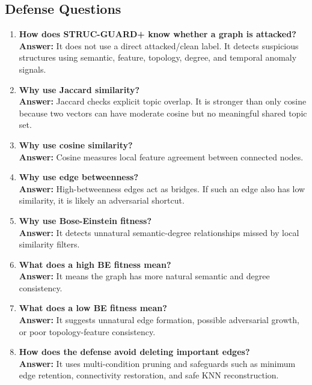 \documentclass[12pt,a4paper]{article}
\begin{document}
\subsection{Defense Questions}
\begin{enumerate}[label=\textbf{Q\arabic*.},resume]
    \item \textbf{How does STRUC-GUARD+ know whether a graph is attacked?}\\
    \textbf{Answer:} It does not use a direct attacked/clean label. It detects suspicious structures using semantic, feature, topology, degree, and temporal anomaly signals.

    \item \textbf{Why use Jaccard similarity?}\\
    \textbf{Answer:} Jaccard checks explicit topic overlap. It is stronger than only cosine because two vectors can have moderate cosine but no meaningful shared topic set.

    \item \textbf{Why use cosine similarity?}\\
    \textbf{Answer:} Cosine measures local feature agreement between connected nodes.

    \item \textbf{Why use edge betweenness?}\\
    \textbf{Answer:} High-betweenness edges act as bridges. If such an edge also has low similarity, it is likely an adversarial shortcut.

    \item \textbf{Why use Bose-Einstein fitness?}\\
    \textbf{Answer:} It detects unnatural semantic-degree relationships missed by local similarity filters.

    \item \textbf{What does a high BE fitness mean?}\\
    \textbf{Answer:} It means the graph has more natural semantic and degree consistency.

    \item \textbf{What does a low BE fitness mean?}\\
    \textbf{Answer:} It suggests unnatural edge formation, possible adversarial growth, or poor topology-feature consistency.

    \item \textbf{How does the defense avoid deleting important edges?}\\
    \textbf{Answer:} It uses multi-condition pruning and safeguards such as minimum edge retention, connectivity restoration, and safe KNN reconstruction.


\end{enumerate}
\end{document}

